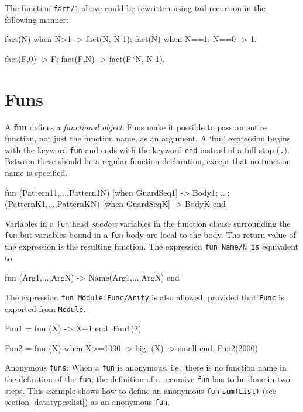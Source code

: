 The function \texttt{fact/1} above could be rewritten using tail
recursion in the following manner:

 \begin{erlang}
fact(N) when N>1 -> fact(N, N-1);
fact(N) when N==1; N==0 -> 1.

fact(F,0) -> F;                 %
fact(F,N) -> fact(F*N, N-1).
\end{erlang}


\section{Funs}
\label{functions:funs}
A \textbf{fun} defines a \textit{functional object}. Funs make it
possible to pass an entire function, not just the function name, as an
argument. A `fun' expression begins with the keyword \texttt{fun} and
ends with the keyword \texttt{end} instead of a full stop
(\texttt{.}).  Between these should be a regular function
declaration, except that no function name is specified.

\begin{erlang}
fun
    (Pattern11,...,Pattern1N) [when GuardSeq1] ->
        Body1;
        ...;
    (PatternK1,...,PatternKN) [when GuardSeqK] ->
        BodyK
end
\end{erlang}

Variables in a \texttt{fun} head \textit{shadow} variables in the function
clause surrounding the \texttt{fun} but variables bound in a \texttt{fun} body are local
to the body.  The return value of the expression is the resulting function. The expression
\texttt{fun Name/N is} equivalent to:

\begin{erlang}
fun (Arg1,...,ArgN) -> Name(Arg1,...,ArgN) end
\end{erlang}

The expression \texttt{fun Module:Func/Arity} is also allowed, provided that \texttt{Func} is exported
from \texttt{Module}.

\begin{erlang}
Fun1 = fun (X) -> X+1 end.
Fun1(2)         %

Fun2 = fun (X) when X>=1000 -> big; (X) -> small end.
Fun2(2000)      %
\end{erlang}

Anonymous \texttt{funs}: When a \texttt{fun} is anonymous, i.e.~there is no function name in the definition of the \texttt{fun}, the definition of a recursive \texttt{fun} has to be done in two steps. This example shows how to define an anonymous \texttt{fun} \texttt{sum(List)} (see section \ref{datatypes:list}) as an anonymous \texttt{fun}.

